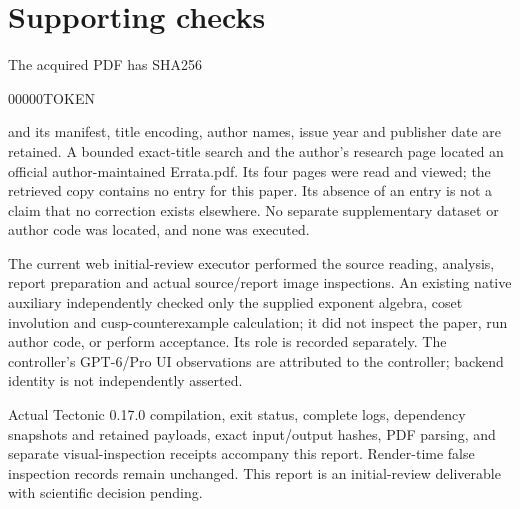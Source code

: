 \documentclass[10pt]{article}
\begin{document}
\section*{Supporting checks}
The acquired PDF has SHA256\par
00000TOKEN\par
and its manifest, title encoding, author names, issue year and publisher date are retained. A bounded exact-title search and the author’s research page located an official author-maintained Errata.pdf. Its four pages were read and viewed; the retrieved copy contains no entry for this paper. Its absence of an entry is not a claim that no correction exists elsewhere. No separate supplementary dataset or author code was located, and none was executed.\par
The current web initial-review executor performed the source reading, analysis, report preparation and actual source/report image inspections. An existing native auxiliary independently checked only the supplied exponent algebra, coset involution and cusp-counterexample calculation; it did not inspect the paper, run author code, or perform acceptance. Its role is recorded separately. The controller’s GPT-6/Pro UI observations are attributed to the controller; backend identity is not independently asserted.\par
Actual Tectonic 0.17.0 compilation, exit status, complete logs, dependency snapshots and retained payloads, exact input/output hashes, PDF parsing, and separate visual-inspection receipts accompany this report. Render-time false inspection records remain unchanged. This report is an initial-review deliverable with scientific decision pending.\par
\end{document}
